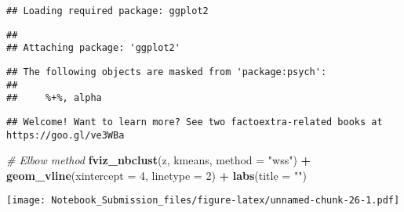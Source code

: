 \documentclass[
]{article}
\newenvironment{Shaded}{\begin{snugshade}}{\end{snugshade}}
\newcommand{\CommentTok}[1]{\textcolor[rgb]{0.56,0.35,0.01}{\textit{#1}}}
\newcommand{\DataTypeTok}[1]{\textcolor[rgb]{0.13,0.29,0.53}{#1}}
\newcommand{\DecValTok}[1]{\textcolor[rgb]{0.00,0.00,0.81}{#1}}
\newcommand{\KeywordTok}[1]{\textcolor[rgb]{0.13,0.29,0.53}{\textbf{#1}}}
\newcommand{\NormalTok}[1]{#1}
\newcommand{\OperatorTok}[1]{\textcolor[rgb]{0.81,0.36,0.00}{\textbf{#1}}}
\newcommand{\StringTok}[1]{\textcolor[rgb]{0.31,0.60,0.02}{#1}}
\begin{document}
\begin{verbatim}
## Loading required package: ggplot2
\end{verbatim}

\begin{verbatim}
## 
## Attaching package: 'ggplot2'
\end{verbatim}

\begin{verbatim}
## The following objects are masked from 'package:psych':
## 
##     %+%, alpha
\end{verbatim}

\begin{verbatim}
## Welcome! Want to learn more? See two factoextra-related books at https://goo.gl/ve3WBa
\end{verbatim}

\begin{Shaded}
\begin{Highlighting}[]
\CommentTok{# Elbow method}
\KeywordTok{fviz_nbclust}\NormalTok{(z, kmeans, }\DataTypeTok{method =} \StringTok{"wss"}\NormalTok{) }\OperatorTok{+}
\StringTok{  }\KeywordTok{geom_vline}\NormalTok{(}\DataTypeTok{xintercept =} \DecValTok{4}\NormalTok{, }\DataTypeTok{linetype =} \DecValTok{2}\NormalTok{) }\OperatorTok{+}\StringTok{ }\KeywordTok{labs}\NormalTok{(}\DataTypeTok{title =} \StringTok{""}\NormalTok{)}
\end{Highlighting}
\end{Shaded}

\texttt{[image: Notebook\_Submission\_files/figure-latex/unnamed-chunk-26-1.pdf]}
\end{document}
